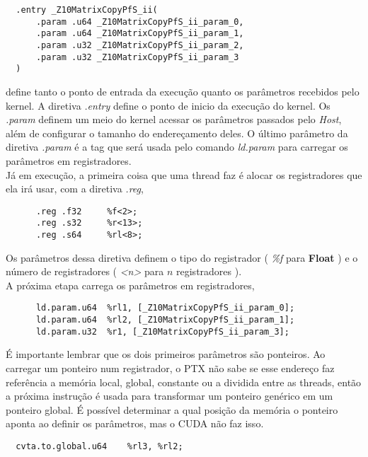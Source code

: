 \begin{lstlisting}
  .entry _Z10MatrixCopyPfS_ii(
	  .param .u64 _Z10MatrixCopyPfS_ii_param_0,
	  .param .u64 _Z10MatrixCopyPfS_ii_param_1,
	  .param .u32 _Z10MatrixCopyPfS_ii_param_2,
	  .param .u32 _Z10MatrixCopyPfS_ii_param_3
  )
\end{lstlisting}

define tanto o ponto de entrada da execução quanto os parâmetros recebidos pelo kernel. A diretiva \textit{.entry} define o ponto de inicio da execução do kernel.
Os \textit{.param} definem um meio do kernel acessar os parâmetros passados pelo \textit{Host}, além de configurar o tamanho do endereçamento deles. 
O último parâmetro da diretiva \textit{.param} é a tag que será usada pelo comando \textit{ld.param} para carregar os parâmetros em registradores. \\

Já em execução, a primeira coisa que uma thread faz é alocar os registradores que ela irá usar, com a diretiva \textit{.reg},

\begin{lstlisting}
	  .reg .f32 	%f<2>;
	  .reg .s32 	%r<13>;
	  .reg .s64 	%rl<8>;
\end{lstlisting}

Os parâmetros dessa diretiva definem o tipo do registrador ( \textit{\%f} para \textbf{Float} ) e o número de registradores ( \textit{<n>} para $n$ registradores ). \\

A próxima etapa carrega os parâmetros em registradores,

\begin{lstlisting}
	  ld.param.u64 	%rl1, [_Z10MatrixCopyPfS_ii_param_0];
	  ld.param.u64 	%rl2, [_Z10MatrixCopyPfS_ii_param_1];
	  ld.param.u32 	%r1, [_Z10MatrixCopyPfS_ii_param_3];
\end{lstlisting}

É importante lembrar que os dois primeiros parâmetros são ponteiros. Ao carregar um ponteiro num registrador, 
o PTX não sabe se esse endereço faz referência a memória local, global, constante ou a dividida entre as threads, 
então a próxima instrução é usada para transformar um ponteiro genérico em um ponteiro global. É possível determinar
a qual posição da memória o ponteiro aponta ao definir os parâmetros, mas o CUDA não faz isso.

\begin{lstlisting}
  cvta.to.global.u64 	%rl3, %rl2;
\end{lstlisting}

